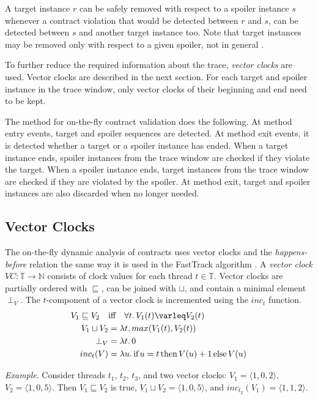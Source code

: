 A target instance $r$ can be safely removed with respect to a spoiler instance
$s$ whenever a contract violation that would be detected between $r$ and $s$,
can be detected between $s$ and another target instance too. Note that target
instances may be removed only with respect to a given spoiler, not in general
\cite{contracts}.

To further reduce the required information about the trace, \emph{vector clocks}
are used. Vector clocks are described in the next section. For each target and
spoiler instance in the trace window, only vector clocks of their beginning and
end need to be kept.

The method for on-the-fly contract validation does the following. At method
entry events, target and spoiler sequences are detected. At method exit events,
it is detected whether a target or a spoiler instance has ended. When a target
instance ends, spoiler instances from the trace window are checked if they
violate the target. When a spoiler instance ends, target instances from the
trace window are checked if they are violated by the spoiler. At method exit,
target and spoiler instances are also discarded when no longer needed.

\subsection{Vector Clocks}

The on-the-fly dynamic analysis of contracts uses vector clocks and the
\emph{happens-before} relation the same way it is used in the FastTrack
algorithm \cite{fasttrack}. A \emph{vector clock} $VC: \mathbb{T} \rightarrow
\mathbb{N}$ consists of clock values for each thread $t \in \mathbb{T}$. Vector
clocks are partially ordered with $\sqsubseteq$, can be joined with $\sqcup$,
and contain a minimal element $\perp_V$. The $t$-component of a vector clock is
incremented using the $inc_t$ function.
\begin{align*}
    V_1 \sqsubseteq V_2 \quad &\text{iff} \quad \forall t. \, V_1(t) \varleq
    V_2(t) \\
    V_1 \sqcup V_2 &= \lambda t. \, max(V_1(t), V_2(t)) \\
    \perp_V &= \lambda t. \, 0 \\
    inc_t(V) &= \lambda u. \, \text{if} \, u=t \, \text{then} \, V(u)+1 \,
    \text{else} \, V(u)
\end{align*}

\emph{Example}. Consider threads $t_1$, $t_2$, $t_3$, and two vector clocks:
$V_1 = \langle 1,0,2 \rangle$, $V_2 = \langle 1,0,5 \rangle$. Then $V_1
\sqsubseteq V_2$ is true, $V_1 \sqcup V_2 = \langle 1,0,5 \rangle$, and
$inc_{t_2}(V_1) = \langle 1,1,2 \rangle$.

